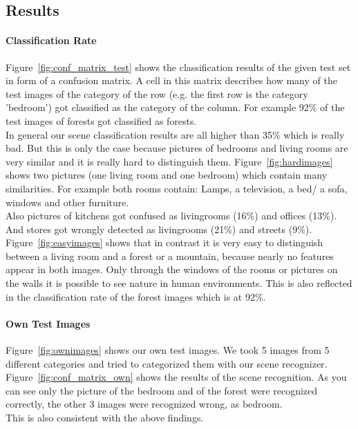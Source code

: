 \documentclass[subfigure,epsfig,fleqn,float,numbers=noenddot]{scrartcl}
\begin{document}
\subsection{Results}
\label{sec:results}

\paragraph{Classification Rate}
\label{sec:classification}
Figure~\ref{fig:conf_matrix_test} shows the classification results of the given test set in form of a confusion matrix. A cell in this matrix describes how many of the test images of the category of the row (e.g. the first row is the category 'bedroom') got classified as the category of the column. For example 92\% of the test images of forests got classified as forests.\\
In general our scene classification results are all higher than 35\% which is really bad. But this is only the case because pictures of bedrooms and living rooms are very similar and it is really hard to distinguish them. Figure~\ref{fig:hardimages} shows two pictures (one living room and one bedroom) which contain many similarities. For example both rooms contain: Lamps, a television, a bed/ a sofa, windows and other furniture.\\
Also pictures of kitchens got confused as livingrooms (16\%) and offices (13\%). And stores got wrongly detected as livingrooms (21\%) and streets (9\%).
Figure~\ref{fig:easyimages} shows that in contrast it is very easy to distinguish between a living room and a forest or a mountain, because nearly no features appear in both images. Only through the windows of the rooms or pictures on the walls it is possible to see nature in human environments. This is also reflected in the classification rate of the forest images which is at 92\%.

\paragraph{Own Test Images}
\label{sec:owntestimages}
Figure~\ref{fig:ownimages} shows our own test images. We took 5 images from 5 different categories and tried to categorized them with our scene recognizer. Figure~\ref{fig:conf_matrix_own} shows the results of the scene recognition. As you can see only the picture of the bedroom and of the forest were recognized correctly, the other 3 images were recognized wrong, as bedroom.\\ This is also consistent with the above findings.
\end{document}
